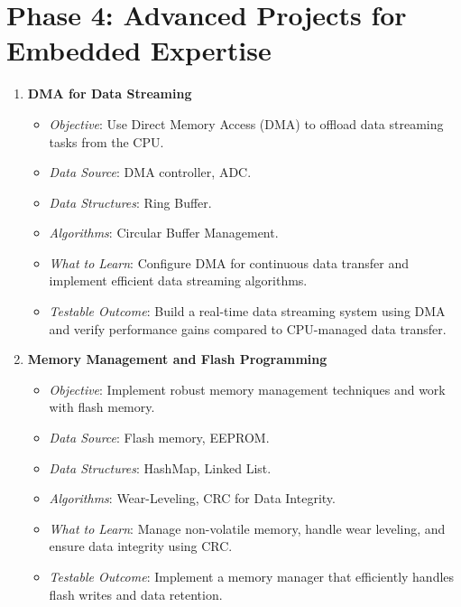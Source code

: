 \documentclass{article}
\begin{document}
\section{Phase 4: Advanced Projects for Embedded Expertise}
\begin{enumerate}[label=\arabic*.]
    \item \textbf{DMA for Data Streaming}
    \begin{itemize}
        \item \textit{Objective}: Use Direct Memory Access (DMA) to offload data streaming tasks from the CPU.
        \item \textit{Data Source}: DMA controller, ADC.
        \item \textit{Data Structures}: Ring Buffer.
        \item \textit{Algorithms}: Circular Buffer Management.
        \item \textit{What to Learn}: Configure DMA for continuous data transfer and implement efficient data streaming algorithms.
        \item \textit{Testable Outcome}: Build a real-time data streaming system using DMA and verify performance gains compared to CPU-managed data transfer.
    \end{itemize}

    \item \textbf{Memory Management and Flash Programming}
    \begin{itemize}
        \item \textit{Objective}: Implement robust memory management techniques and work with flash memory.
        \item \textit{Data Source}: Flash memory, EEPROM.
        \item \textit{Data Structures}: HashMap, Linked List.
        \item \textit{Algorithms}: Wear-Leveling, CRC for Data Integrity.
        \item \textit{What to Learn}: Manage non-volatile memory, handle wear leveling, and ensure data integrity using CRC.
        \item \textit{Testable Outcome}: Implement a memory manager that efficiently handles flash writes and data retention.
    \end{itemize}


\end{enumerate}
\end{document}
